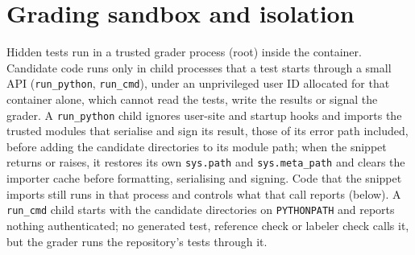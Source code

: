 \section{Grading sandbox and isolation}
\label{app:grading}\label{sec:grading}
Hidden tests run in a trusted grader process (root) inside the container. Candidate code runs only in child processes
that a test starts through a small API (\texttt{run\_python}, \texttt{run\_cmd}), under an unprivileged user ID allocated
for that container alone, which cannot read the tests, write the results or signal the grader. A \texttt{run\_python}
child ignores user-site and startup hooks and imports the trusted modules that serialise and sign its result, those of
its error path included, before adding the candidate directories to its module path; when the snippet returns or
raises, it restores its own \texttt{sys.path} and \texttt{sys.meta\_path} and clears the importer cache before
formatting, serialising and signing. Code that the snippet imports still runs in that process and controls what that
call reports (below). A \texttt{run\_cmd} child starts with the candidate directories on \texttt{PYTHONPATH} and reports
nothing authenticated; no generated test, reference check or labeler check calls it, but the grader runs the
repository's tests through it.
